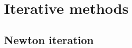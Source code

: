 \documentclass{beamer}
\newcounter{counter1}
\theoremstyle{plain}
\newtheorem{mylem}[counter1]{Lemma}
\theoremstyle{definition}
\theoremstyle{remark}
\newtheorem{myoss}[counter1]{Remark}
\newcommand{\pa}[1]{\left(#1\right)}
\begin{document}


\section{Iterative methods}

\subsection{Newton iteration}

  


\end{document}
